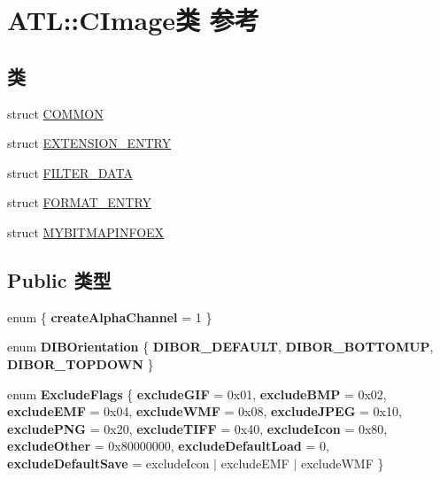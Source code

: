 \hypertarget{class_a_t_l_1_1_c_image}{}\section{A\+TL\+:\+:C\+Image类 参考}
\label{class_a_t_l_1_1_c_image}
\subsection*{类}
\begin{DoxyCompactItemize}
\item 
struct \hyperlink{struct_a_t_l_1_1_c_image_1_1_c_o_m_m_o_n}{C\+O\+M\+M\+ON}
\item 
struct \hyperlink{struct_a_t_l_1_1_c_image_1_1_e_x_t_e_n_s_i_o_n___e_n_t_r_y}{E\+X\+T\+E\+N\+S\+I\+O\+N\+\_\+\+E\+N\+T\+RY}
\item 
struct \hyperlink{struct_a_t_l_1_1_c_image_1_1_f_i_l_t_e_r___d_a_t_a}{F\+I\+L\+T\+E\+R\+\_\+\+D\+A\+TA}
\item 
struct \hyperlink{struct_a_t_l_1_1_c_image_1_1_f_o_r_m_a_t___e_n_t_r_y}{F\+O\+R\+M\+A\+T\+\_\+\+E\+N\+T\+RY}
\item 
struct \hyperlink{struct_a_t_l_1_1_c_image_1_1_m_y_b_i_t_m_a_p_i_n_f_o_e_x}{M\+Y\+B\+I\+T\+M\+A\+P\+I\+N\+F\+O\+EX}
\end{DoxyCompactItemize}
\subsection*{Public 类型}
\begin{DoxyCompactItemize}
\item 
\mbox{\label{class_a_t_l_1_1_c_image_a6f4ceacb435d28a640f178fa409343ec}} 
enum \{ {\bfseries create\+Alpha\+Channel} = 1
 \}
\item 
\mbox{\label{class_a_t_l_1_1_c_image_a6ae8d1e6eadfeafe7abe9ef0dcd5a3aa}} 
enum {\bfseries D\+I\+B\+Orientation} \{ {\bfseries D\+I\+B\+O\+R\+\_\+\+D\+E\+F\+A\+U\+LT}, 
{\bfseries D\+I\+B\+O\+R\+\_\+\+B\+O\+T\+T\+O\+M\+UP}, 
{\bfseries D\+I\+B\+O\+R\+\_\+\+T\+O\+P\+D\+O\+WN}
 \}
\item 
\mbox{\label{class_a_t_l_1_1_c_image_afaebabf047d6248b69dc09a5d3b3e5da}} 
enum {\bfseries Exclude\+Flags} \{ \newline
{\bfseries exclude\+G\+IF} = 0x01, 
{\bfseries exclude\+B\+MP} = 0x02, 
{\bfseries exclude\+E\+MF} = 0x04, 
{\bfseries exclude\+W\+MF} = 0x08, 
\newline
{\bfseries exclude\+J\+P\+EG} = 0x10, 
{\bfseries exclude\+P\+NG} = 0x20, 
{\bfseries exclude\+T\+I\+FF} = 0x40, 
{\bfseries exclude\+Icon} = 0x80, 
\newline
{\bfseries exclude\+Other} = 0x80000000, 
{\bfseries exclude\+Default\+Load} = 0, 
{\bfseries exclude\+Default\+Save} = exclude\+Icon $\vert$ exclude\+E\+MF $\vert$ exclude\+W\+MF
 \}
\end{DoxyCompactItemize}
